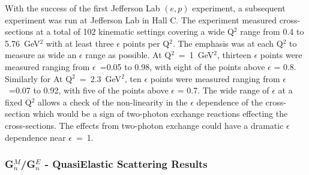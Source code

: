 With the success of the first Jefferson Lab $(e,p)$ experiment, a subsequent experiment was run at Jefferson Lab in Hall C.
The experiment measured cross-sections at a total of 102 kinematic settings covering  a wide Q$^2$ range from 0.4 to 5.76~GeV$^2$
with at least three $\epsilon$ points per Q$^2$. The emphasis was at each Q$^2$ to measure as wide an $\epsilon$ range as possible.
At Q$^2$~=~1~GeV$^2$, thirteen $\epsilon$ points were measured ranging from $\epsilon$~=0.05 to 0.98, with eight of the points
above $\epsilon$ = 0.8. Similarly for At Q$^2$~=~2.3~GeV$^2$, ten $\epsilon$ points were measured ranging from $\epsilon$~=0.07 to 0.92, 
with five of the points above $\epsilon$ = 0.7.  The wide range of  $\epsilon$ at a fixed Q$^2$ allows a check of the non-linearity 
in the $\epsilon$  dependence of the cross-section which would be a sign of two-photon exchange reactions effecting the cross-sections.
The effects from two-photon exchange could have a dramatic  $\epsilon$  dependence near  $\epsilon$~=~1.


\subsubsection{G$^M_n$/G$^E_n$ - QuasiElastic Scattering Results}
\label{subsubsec:gmn}
